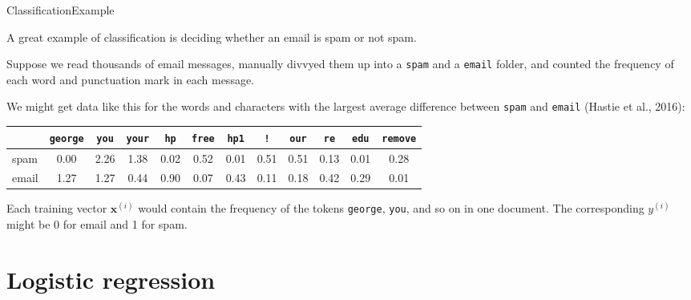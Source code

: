 \documentclass{beamer}
\renewcommand{\vec}[1]{\boldsymbol{#1}}
\begin{document}
\begin{frame}{Classification}{Example}

  A great example of classification is deciding whether an email is
  \alert{spam or not spam}.

  \medskip

  Suppose we read thousands of email messages, manually divvyed them
  up into a \texttt{spam} and a \texttt{email} folder, and counted the
  \alert{frequency of each word and punctuation mark} in each message.

  \medskip

  We might get data like this for the words and characters with the
  largest average difference between \texttt{spam} and \texttt{email}
  (Hastie et al., 2016):

  \begin{center}
    \scriptsize
    \begin{tabular}{lccccccccccc}
      \hline & \texttt{george} & \texttt{you} & \texttt{your} &
      \texttt{hp} & \texttt{free} & \texttt{hp1} & \texttt{!} &
      \texttt{our} & \texttt{re} & \texttt{edu} & \texttt{remove}
      \\
      \hline
      spam & 0.00 & 2.26 & 1.38 & 0.02 & 0.52 & 0.01 & 0.51 &
      0.51 & 0.13 & 0.01 & 0.28 \\
      email & 1.27 & 1.27 & 0.44 & 0.90 & 0.07 & 0.43 & 0.11 & 0.18 & 0.42 & 0.29 & 0.01 \\ \hline
    \end{tabular}
  \end{center}

Each training vector $\vec{x}^{(i)}$ would contain the frequency of the tokens
\texttt{george}, \texttt{you},
and so on in one document. The corresponding $y^{(i)}$ might
be 0 for email and 1 for spam.

\end{frame}

\section{Logistic regression}
\end{document}
